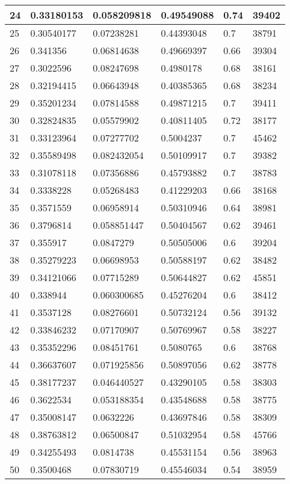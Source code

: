 \begin{longtable}{|l|l|l|l|l|l|}
24 & 0.33180153 & 0.058209818 & 0.49549088 & 0.74 & 39402 \\ \hline 
25 & 0.30540177 & 0.07238281 & 0.44393048 & 0.7 & 38791 \\ \hline 
26 & 0.341356 & 0.06814638 & 0.49669397 & 0.66 & 39304 \\ \hline 
27 & 0.3022596 & 0.08247698 & 0.4980178 & 0.68 & 38161 \\ \hline 
28 & 0.32194415 & 0.06643948 & 0.40385365 & 0.68 & 38234 \\ \hline 
29 & 0.35201234 & 0.07814588 & 0.49871215 & 0.7 & 39411 \\ \hline 
30 & 0.32824835 & 0.05579902 & 0.40811405 & 0.72 & 38177 \\ \hline 
31 & 0.33123964 & 0.07277702 & 0.5004237 & 0.7 & 45462 \\ \hline 
32 & 0.35589498 & 0.082432054 & 0.50109917 & 0.7 & 39382 \\ \hline 
33 & 0.31078118 & 0.07356886 & 0.45793882 & 0.7 & 38783 \\ \hline 
34 & 0.3338228 & 0.05268483 & 0.41229203 & 0.66 & 38168 \\ \hline 
35 & 0.3571559 & 0.06958914 & 0.50310946 & 0.64 & 38981 \\ \hline 
36 & 0.3796814 & 0.058851447 & 0.50404567 & 0.62 & 39461 \\ \hline 
37 & 0.355917 & 0.0847279 & 0.50505006 & 0.6 & 39204 \\ \hline 
38 & 0.35279223 & 0.06698953 & 0.50588197 & 0.62 & 38482 \\ \hline 
39 & 0.34121066 & 0.07715289 & 0.50644827 & 0.62 & 45851 \\ \hline 
40 & 0.338944 & 0.060300685 & 0.45276204 & 0.6 & 38412 \\ \hline 
41 & 0.3537128 & 0.08276601 & 0.50732124 & 0.56 & 39132 \\ \hline 
42 & 0.33846232 & 0.07170907 & 0.50769967 & 0.58 & 38227 \\ \hline 
43 & 0.35352296 & 0.08451761 & 0.5080765 & 0.6 & 38768 \\ \hline 
44 & 0.36637607 & 0.071925856 & 0.50897056 & 0.62 & 38778 \\ \hline 
45 & 0.38177237 & 0.046440527 & 0.43290105 & 0.58 & 38303 \\ \hline 
46 & 0.3622534 & 0.053188354 & 0.43548688 & 0.58 & 38775 \\ \hline 
47 & 0.35008147 & 0.0632226 & 0.43697846 & 0.58 & 38309 \\ \hline 
48 & 0.38763812 & 0.06500847 & 0.51032954 & 0.58 & 45766 \\ \hline 
49 & 0.34255493 & 0.0814738 & 0.45531154 & 0.56 & 38963 \\ \hline 
50 & 0.3500468 & 0.07830719 & 0.45546034 & 0.54 & 38959 \\ \hline 
\end{longtable}